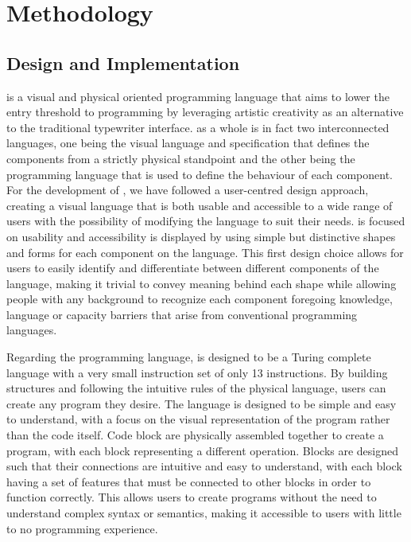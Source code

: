 \chapter{Methodology}
\label{cha:methodology}

\section{Design and Implementation}
\sculpt is a visual and physical oriented programming language that aims to lower the entry threshold to programming by leveraging artistic creativity as an alternative to the traditional typewriter interface.
\sculpt as a whole is in fact two interconnected languages, one being the visual language and specification that defines the components from a strictly physical standpoint and the other being the programming language that is used to define the behaviour of each component.
For the development of \sculpt, we have followed a user-centred design approach, creating a visual language that is both usable and accessible to a wide range of users with the possibility of modifying the language to suit their needs.
\sculpt is focused on usability and accessibility is displayed by using simple but distinctive shapes and forms for each component on the language.
This first design choice allows for users to easily identify and differentiate between different components of the language, making it trivial to convey meaning behind each shape while allowing people with any background to recognize each component foregoing knowledge, language or capacity barriers that arise from conventional programming languages.

Regarding the programming language, \sculpt is designed to be a Turing complete language with a very small instruction set of only 13 instructions.
By building structures and following the intuitive rules of the physical language, users can create any program they desire.
The language is designed to be simple and easy to understand, with a focus on the visual representation of the program rather than the code itself.
Code block are physically assembled together to create a program, with each block representing a different operation. Blocks are designed such that their connections are intuitive and easy to understand, with each block having a set of features that must be connected to other blocks in order to function correctly.
This allows users to create programs without the need to understand complex syntax or semantics, making it accessible to users with little to no programming experience.


